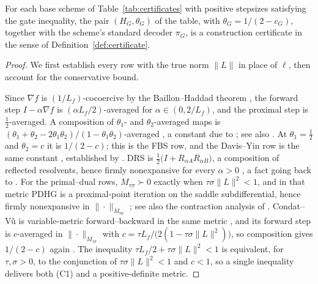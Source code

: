 \begin{lemma}
\label{lem:base-certificates}
For each base scheme of Table~\ref{tab:certificates} with positive stepsizes
satisfying the gate inequality, the pair $(H_G,\theta_G)$ of the table, with
$\theta_G=1/(2-c_G)$, together with the scheme's standard decoder $\pi_G$,
is a construction certificate in the sense of
Definition~\ref{def:certificate}.
\end{lemma}

\begin{proof}
We first establish every row with the true norm $\|L\|$ in place of
$\ell$, then account for the conservative bound.

Since $\nabla f$ is $(1/L_f)$-cocoercive by the Baillon--Haddad theorem
\citep{BaillonHaddad1977Quelques}, the forward step $I-\alpha\nabla f$ is
$(\alpha L_f/2)$-averaged for $\alpha\in(0,2/L_f)$, and the proximal step is
$\tfrac12$-averaged. A composition of $\theta_1$- and $\theta_2$-averaged
maps is $(\theta_1+\theta_2-2\theta_1\theta_2)/(1-\theta_1\theta_2)$-averaged
\citep[Theorem~27]{RyuYin2022LargeScale}, a constant due to
\citet{OguraYamada2002Nonstrictly}; see also
\citet{CombettesYamada2015Compositions}. At $\theta_1=\tfrac12$ and
$\theta_2=c$ it is $1/(2-c)$; this is the FBS row, and the Davis--Yin row is
the same constant \citep[Theorem~28]{RyuYin2022LargeScale}, established by
\citet{DavisYin2017Three}. DRS is
$\tfrac12\bigl(I+R_{\alpha A}R_{\alpha B}\bigr)$, a composition of reflected
resolvents, hence firmly nonexpansive for every $\alpha>0$
\citep[\S2.7]{RyuYin2022LargeScale}, a fact going back to
\citet{LionsMercier1979Splitting}. For the primal--dual rows,
$M_{\tau\sigma}\succ0$ exactly when $\tau\sigma\|L\|^2<1$, and in that metric
PDHG \citep{ChambollePock2011First} is a proximal-point iteration on the
saddle subdifferential, hence firmly nonexpansive in
$\|\cdot\|_{M_{\tau\sigma}}$ \citep[\S3.3]{RyuYin2022LargeScale}; see also
the contraction analysis of \citet{HeYuan2012Convergence}. Condat--V\~u
\citep{Condat2013Primal,Vu2013Splitting} is variable-metric
forward--backward in the same metric \citep{CombettesVu2014Variable}, and its
forward step is $c$-averaged in $\|\cdot\|_{M_{\tau\sigma}}$ with
$c=\tau L_f/\bigl(2(1-\tau\sigma\|L\|^2)\bigr)$, so composition gives
$1/(2-c)$ again \citep[\S3.3]{RyuYin2022LargeScale}. The inequality
$\tau L_f/2+\tau\sigma\|L\|^2<1$ is equivalent, for $\tau,\sigma>0$, to the
conjunction of $\tau\sigma\|L\|^2<1$ and $c<1$, so a single inequality
delivers both (C1) and a positive-definite metric.


\end{proof}
